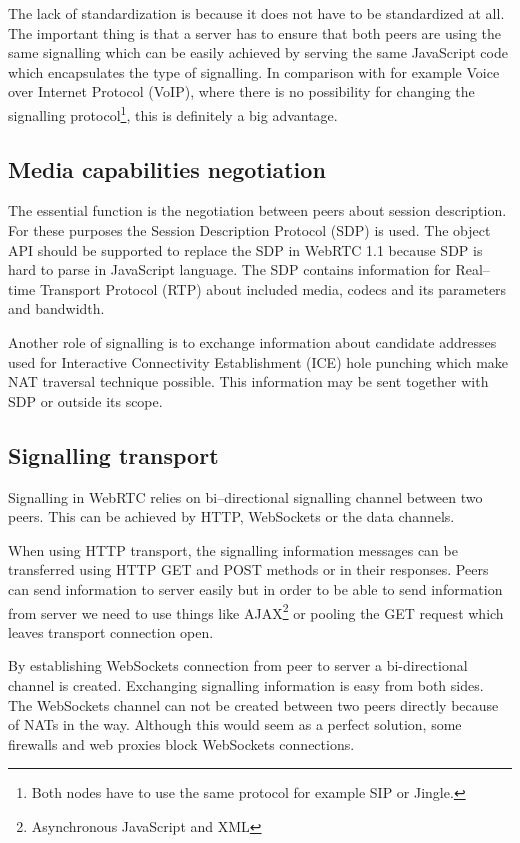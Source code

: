 The lack of standardization is because it does not have to be standardized at all. The important thing is that a server has to ensure that both peers are using the same signalling which can be easily achieved by serving the same JavaScript code which encapsulates the type of signalling. In comparison with for example Voice over Internet Protocol (VoIP), where there is no possibility for changing the signalling protocol\footnote{Both nodes have to use the same protocol for example SIP or Jingle.}, this is definitely a big advantage.

\subsection{Media capabilities negotiation}
The essential function is the negotiation between peers about session description. For these purposes the Session Description Protocol (SDP) is used. The object API should be supported to replace the SDP in WebRTC 1.1 because SDP is hard to parse in JavaScript language. The SDP contains information for Real--time Transport Protocol (RTP) about included media, codecs and its parameters and bandwidth.

Another role of signalling is to exchange information about candidate addresses used for Interactive Connectivity Establishment (ICE) hole punching which make NAT traversal technique possible. This information may be sent together with SDP or outside its scope.

\subsection{Signalling transport}
Signalling in WebRTC relies on bi--directional signalling channel between two peers. This can be achieved by HTTP, WebSockets or the data channels.

When using HTTP transport, the signalling information messages can be transferred using HTTP GET and POST methods or in their responses. Peers can send information to server easily but in order to be able to send information from server we need to use things like AJAX\footnote{Asynchronous JavaScript and XML} or pooling the GET request which leaves transport connection open.

By establishing WebSockets connection from peer to server a bi-directional channel is created. Exchanging signalling information is easy from both sides. The WebSockets channel can not be created between two peers directly because of NATs in the way. Although this would seem as a perfect solution, some firewalls and web proxies block WebSockets connections.


